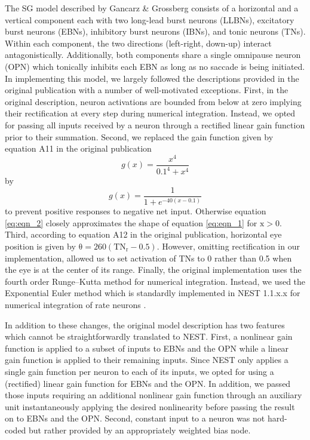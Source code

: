 \documentclass[10pt,a4paper,onecolumn]{article}
\begin{document}
The SG model described by Gancarz \& Grossberg \autocite{Gancarz1998}
consists of a horizontal and a vertical component each with two
long-lead burst neurons (LLBNs), excitatory burst neurons (EBNs),
inhibitory burst neurons (IBNs), and tonic neurons (TNs). Within each
component, the two directions (left-right, down-up) interact
antagonistically. Additionally, both components share a single omnipause
neuron (OPN) which tonically inhibits each EBN as long as no saccade is
being initiated. In implementing this model, we largely followed the
descriptions provided in the original publication with a number of
well-motivated exceptions. First, in the original description, neuron
activations are bounded from below at zero implying their rectification
at every step during numerical integration. Instead, we opted for
passing all inputs received by a neuron through a rectified linear gain
function prior to their summation. Second, we replaced the gain function
given by equation A11 in the original publication
\begin{equation} g(x) = {\frac{x^4}{0.1^4+x^4}} \label{eq:eqn_1}\end{equation}
by
\begin{equation} g(x) = {\frac{1}{1+e^{-40(x-0.1)}}} \label{eq:eqn_2}\end{equation}
to prevent positive responses to negative net input. Otherwise equation
\ref{eq:eqn_2} closely approximates the shape of equation \ref{eq:eqn_1}
for \(\mathrm{x>0}\). Third, according to equation A12 in the original
publication, horizontal eye position is given by
\(\mathrm{\theta=260({TN}_{r}-0.5)}\). However, omitting rectification
in our implementation, allowed us to set activation of TNs to 0 rather
than 0.5 when the eye is at the center of its range. Finally, the
original implementation uses the fourth order Runge--Kutta method for
numerical integration. Instead, we used the Exponential Euler method
which is standardly implemented in NEST 1.1.x.x for numerical
integration of rate neurons \autocite{Hahne2016}.

In addition to these changes, the original model description has two
features which cannot be straightforwardly translated to NEST. First, a
nonlinear gain function is applied to a subset of inputs to EBNs and the
OPN while a linear gain function is applied to their remaining inputs.
Since NEST only applies a single gain function per neuron to each of its
inputs, we opted for using a (rectified) linear gain function for EBNs
and the OPN. In addition, we passed those inputs requiring an additional
nonlinear gain function through an auxiliary unit instantaneously
applying the desired nonlinearity before passing the result on to EBNs
and the OPN. Second, constant input to a neuron was not hard-coded but
rather provided by an appropriately weighted bias node.
\end{document}
